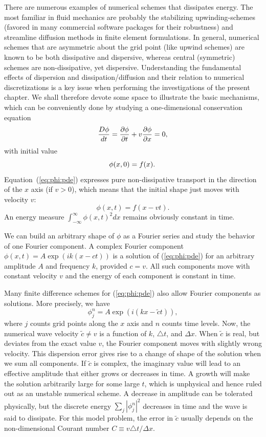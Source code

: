 There are numerous examples of numerical schemes that dissipates
energy. The most familiar in fluid mechanics are probably the
stabilizing upwinding-schemes (favored in many commercial software
packages for their robustness) and streamline diffusion methods in finite
element formulations. In general, numerical schemes that are asymmetric
about the grid point (like upwind schemes) are known to be both
dissipative and dispersive, whereas central (symmetric) schemes are
non-dissipative, yet dispersive. Understanding the fundamental effects
of dispersion and dissipation/diffusion and their relation to numerical
discretizations is a key issue when performing the investigations of
the present chapter. We shall therefore devote some space to illustrate
the basic mechanisms, which can be conveniently done by studying
a one-dimensional conservation equation
\begin{equation}
{D\phi\over dt} = {\partial\phi\over\partial t} + v{\partial\phi\over\partial x}
=0,
\label{eq:phi:pde}
\end{equation}
with initial value
\[ \phi(x,0)=f(x) . \thinspace\]
Equation~(\ref{eq:phi:pde}) expresses pure non-dissipative transport
in the direction of the $x$ axis (if $v>0$), which means that the initial
shape just moves with velocity $v$:
\[ \phi(x,t) = f(x-vt).\]
An energy measure $\int_{-\infty}^\infty\phi(x,t)^2dx$ remains obviously
constant in time.

We can build an arbitrary shape of $\phi$ as a Fourier
series and study the behavior of one Fourier component.
A complex Fourier component
$\phi (x,t)=A\exp{(ik(x - ct))}$ is a solution of (\ref{eq:phi:pde})
for an arbitrary amplitude $A$ and frequency $k$, provided $c = v$.
All such components move
with constant velocity $v$ and the energy of each component is constant
in time.

Many finite difference schemes for (\ref{eq:phi:pde}) also allow
Fourier components as solutions. More precisely, we have
\[ \phi_j^n = A\exp{(i(kx - \tilde c t))},\]
where $j$ counts grid points along the $x$ axis and $n$ counts time levels.
Now, the numerical wave velocity $\tilde c \neq v$ is a function of
$k$, $\triangle t$, and $\Delta x$.
When $\tilde c$ is real,
but deviates from the exact value $v$, the Fourier component moves
with slightly wrong velocity. This dispersion error gives rise to a change
of shape of the solution when we sum all components.
If $\tilde c$ is complex, the imaginary value will lead to an effective
amplitude that either grows or decreases in time. A growth will
make the solution arbitrarily large for some large $t$, which is unphysical
and hence ruled out as an unstable numerical scheme.
A decrease in amplitude can be tolerated physically,
but the discrete energy $\sum_j |\phi_j^n|^2$ decreases in time and the
wave is said to dissipate.
For this model problem,
the error in $\tilde c$ usually depends on the non-dimensional
Courant number $C\equiv v\triangle t/\Delta x$.

